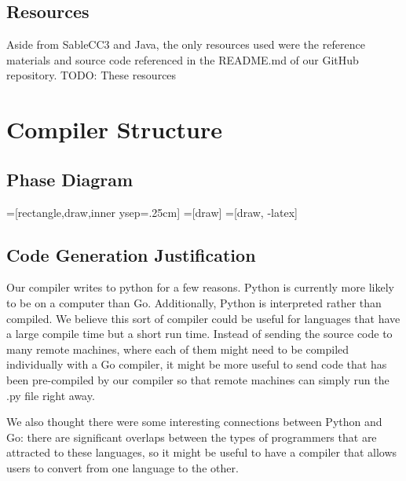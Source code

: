 \documentclass{article}
\begin{document}
\subsection{Resources}
Aside from SableCC3 and Java, the only resources used were the reference materials and source code referenced in the README.md of our GitHub repository. TODO: These resources

\section{Compiler Structure}

\subsection{Phase Diagram}

=[rectangle,draw,inner ysep=.25cm]
=[draw]
=[draw, -latex] 


\subsection{Code Generation Justification}
Our compiler writes to python for a few reasons. Python is currently more likely to be on a computer than Go. Additionally, Python is interpreted rather than compiled. We believe this sort of compiler could be useful for languages that have a large compile time but a short run time. Instead of sending the source code to many remote machines, where each of them might need to be compiled individually with a Go compiler, it might be more useful to send code that has been pre-compiled by our compiler so that remote machines can simply run the .py file right away.

We also thought there were some interesting connections between Python and Go: there are significant overlaps between the types of programmers that are attracted to these languages, so it might be useful to have a compiler that allows users to convert from one language to the other. 
\end{document}
